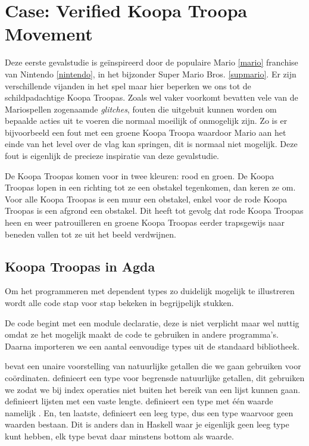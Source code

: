 \chapter{Case: Verified Koopa Troopa Movement}
\label{ch:case-koopa}

Deze eerste gevalstudie is geïnspireerd door de populaire Mario \ref{mario}
franchise van Nintendo \ref{nintendo}, in het bijzonder Super Mario Bros.
\ref{supmario}. Er zijn verschillende vijanden in het spel maar hier beperken
we ons tot de schildpadachtige Koopa Troopas. Zoals wel vaker voorkomt bevatten
vele van de Mariospellen zogenaamde \emph{glitches}, fouten die uitgebuit
kunnen worden om bepaalde acties uit te voeren die normaal moeilijk of
onmogelijk zijn. Zo is er bijvoorbeeld een fout met een groene Koopa Troopa
waardoor Mario aan het einde van het level over de vlag kan springen, dit is
normaal niet mogelijk. Deze fout is eigenlijk de precieze inspiratie van deze
gevalstudie.

De Koopa Troopas komen voor in twee kleuren: rood en groen. De Koopa Troopas
lopen in een richting tot ze een obstakel tegenkomen, dan keren ze om. Voor
alle Koopa Troopas is een muur een obstakel, enkel voor de rode Koopa Troopas
is een afgrond een obstakel. Dit heeft tot gevolg dat rode Koopa Troopas heen
en weer patrouilleren en groene Koopa Troopas eerder trapsgewijs naar beneden
vallen tot ze uit het beeld verdwijnen.


\section{Koopa Troopas in Agda}

Om het programmeren met dependent types zo duidelijk mogelijk te illustreren
wordt alle code stap voor stap bekeken in begrijpelijk stukken.  

De code begint met een module declaratie, deze is niet verplicht maar wel
nuttig omdat ze het mogelijk maakt de code te gebruiken in andere programma's.
Daarna importeren we een aantal eenvoudige types uit de standaard bibliotheek.


 bevat een unaire voorstelling van natuurlijke getallen die we
gaan gebruiken voor coördinaten.  definieert een type voor
begrensde natuurlijke getallen, dit gebruiken we zodat we bij index operaties
niet buiten het bereik van een lijst kunnen gaan.  definieert
lijsten met een vaste lengte.  definieert een type met één
waarde namelijk . En, ten laatste,  definieert
een leeg type, dus een type waarvoor geen waarden bestaan. Dit is anders dan in
Haskell waar je eigenlijk geen leeg type kunt hebben, elk type bevat daar
minstens bottom als waarde.


